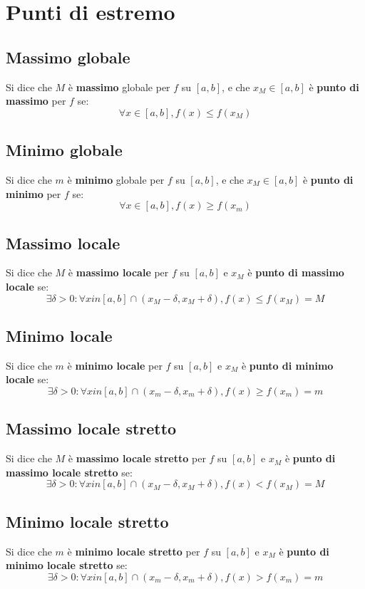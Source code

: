 \documentclass{article}
\begin{document}
\section{Punti di estremo}

\subsection{Massimo globale}
Si dice che \(M\) è \textbf{massimo} globale per \(f\) su \([a, b]\), e che \(x_M \in [a, b]\) è \textbf{punto di massimo} per \(f\) se:
\[\forall x \in [a, b], f(x) \leq f(x_M)\]

\subsection{Minimo globale}
Si dice che \(m\) è \textbf{minimo} globale per \(f\) su \([a, b]\), e che \(x_M \in [a, b]\) è \textbf{punto di minimo} per \(f\) se:
\[\forall x \in [a, b], f(x) \geq f(x_m)\]

\subsection{Massimo locale}
Si dice che \(M\) è \textbf{massimo locale} per \(f\) su \([a, b]\) e \(x_M\) è \textbf{punto di massimo locale} se:
\[\exists \delta > 0 : \forall x in [a, b] \cap (x_M - \delta, x_M + \delta), f(x) \leq f(x_M) = M\]

\subsection{Minimo locale}
Si dice che \(m\) è \textbf{minimo locale} per \(f\) su \([a, b]\) e \(x_M\) è \textbf{punto di minimo locale} se:
\[\exists \delta > 0 : \forall x in [a, b] \cap (x_m - \delta, x_m + \delta), f(x) \geq f(x_m) = m\]

\subsection{Massimo locale stretto}
Si dice che \(M\) è \textbf{massimo locale stretto} per \(f\) su \([a, b]\) e \(x_M\) è \textbf{punto di massimo locale stretto} se:
\[\exists \delta > 0 : \forall x in [a, b] \cap (x_M - \delta, x_M + \delta), f(x) < f(x_M) = M\]

\subsection{Minimo locale stretto}
Si dice che \(m\) è \textbf{minimo locale stretto} per \(f\) su \([a, b]\) e \(x_M\) è \textbf{punto di minimo locale stretto} se:
\[\exists \delta > 0 : \forall x in [a, b] \cap (x_m - \delta, x_m + \delta), f(x) > f(x_m) = m\]
\end{document}

